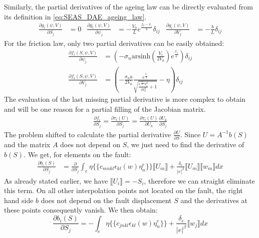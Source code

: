 \documentclass{report}
\begin{document}
Similarly, the partial derivatives of the ageing law can be directly evaluated from its definition in \autoref{eq:SEAS_DAE_ageing_law}.
\begin{align}
	\frac{\partial g_i(\psi,V)}{\partial S_j} &=  0 &
	\frac{\partial g_i(\psi,V)}{\partial\psi_j} &= -\frac{V_0}{L}e^{\frac{f_0-\psi_i}{b}}\delta_{ij} &	
	\frac{\partial g_i(\psi,V)}{\partial V_j} &= -\frac{b}{L} \delta_{ij}
\end{align}
For the friction law, only two partial derivatives can be easily obtained:
\begin{align}
	\frac{\partial f_i(S,\psi,V)}{\partial \psi_j} &= \left(-\sigma_n\text{arsinh}\left(\frac{V_i}{2V_0}\right)e^{\frac{\psi_i}{a}}\right)\delta_{ij} \\	
	\frac{\partial f_i(S,\psi,V)}{\partial V_j} &= \left( -\frac{\sigma_na}{2V_0} \frac{e^{\frac{\psi_i}{a}}}{\sqrt{\frac{e^{\frac{2\psi_i}{a}}V_i^2}{4V_0^2}+1}}-\eta\right)\delta_{ij} 
	\label{eq:partial_df_dV}
\end{align}
The evaluation of the last missing partial derivative is more complex to obtain and will be one reason for a partial filling of the Jacobian matrix.
\begin{align}
	\label{eq:partialDerivative_df_dS}
	\frac{\partial f_i}{\partial S_j} = \frac{\partial \tau_i(U)}{\partial S_j} = \frac{\partial \tau_i(U)}{\partial U_k}\frac{\partial U_k}{\partial S_j}
\end{align}
The problem shifted to calculate the partial derivative $\frac{\partial U}{\partial S}$. Since $U = A^{-1}b(S)$ and the matrix $A$ does not depend on $S$, we just need to find the derivative of $b(S)$. We get, for elements on the fault:
\begin{align}
	\frac{\partial b_i(S)}{\partial S_j} &= \frac{\partial }{\partial S_j}\int_e \eta \{\{c_{mnkl}\epsilon_{kl}(w)\eta_n^e\}\}\llbracket U_m \rrbracket + \frac{\delta_e}{|e|^\beta}\llbracket U_m \rrbracket\llbracket w_m \rrbracket dx
\end{align}
As already stated earlier, we have $\llbracket U_i \rrbracket = -S_i$, therefore we can straight eliminate this term. On all other interpolation points not located on the fault, the right hand side $b$ does not depend on the fault displacement $S$ and the derivatives at these points consequently vanish. We then obtain:
\begin{equation}
	\frac{\partial b_i(S)}{\partial S_j} = -\int_e 
	\eta  \{\{c_{jnkl}\epsilon_{kl}(w)\eta_n^e\}\} +
	\frac{\delta_e}{|e|^\beta}\llbracket w_j \rrbracket dx
\end{equation}
\end{document}
